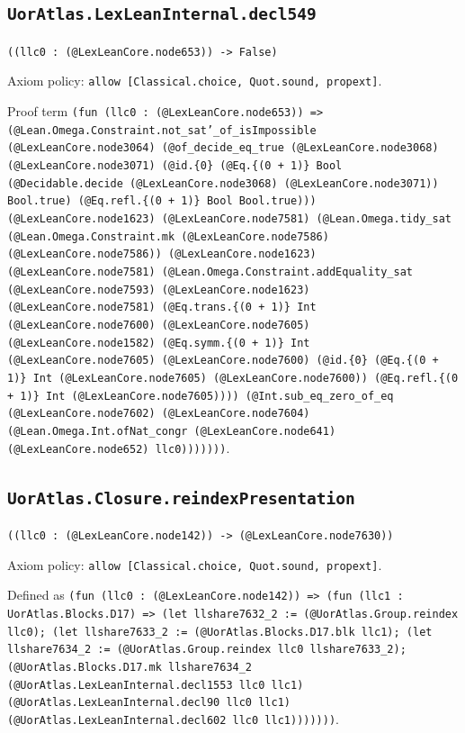 \documentclass[11pt]{article}
\begin{document}
\subsection*{\texttt{UorAtlas.LexLeanInternal.decl549}}
\noindent\texttt{((llc0 : (@LexLeanCore.node653)) -> False)}\par
\noindent Axiom policy: \texttt{allow [Classical.choice, Quot.sound, propext]}.\par
\noindent Proof term \texttt{(fun (llc0 : (@LexLeanCore.node653)) => (@Lean.Omega.Constraint.not\_sat'\_of\_isImpossible (@LexLeanCore.node3064) (@of\_decide\_eq\_true (@LexLeanCore.node3068) (@LexLeanCore.node3071) (@id.\{0\} (@Eq.\{(0 + 1)\} Bool (@Decidable.decide (@LexLeanCore.node3068) (@LexLeanCore.node3071)) Bool.true) (@Eq.refl.\{(0 + 1)\} Bool Bool.true))) (@LexLeanCore.node1623) (@LexLeanCore.node7581) (@Lean.Omega.tidy\_sat (@Lean.Omega.Constraint.mk (@LexLeanCore.node7586) (@LexLeanCore.node7586)) (@LexLeanCore.node1623) (@LexLeanCore.node7581) (@Lean.Omega.Constraint.addEquality\_sat (@LexLeanCore.node7593) (@LexLeanCore.node1623) (@LexLeanCore.node7581) (@Eq.trans.\{(0 + 1)\} Int (@LexLeanCore.node7600) (@LexLeanCore.node7605) (@LexLeanCore.node1582) (@Eq.symm.\{(0 + 1)\} Int (@LexLeanCore.node7605) (@LexLeanCore.node7600) (@id.\{0\} (@Eq.\{(0 + 1)\} Int (@LexLeanCore.node7605) (@LexLeanCore.node7600)) (@Eq.refl.\{(0 + 1)\} Int (@LexLeanCore.node7605)))) (@Int.sub\_eq\_zero\_of\_eq (@LexLeanCore.node7602) (@LexLeanCore.node7604) (@Lean.Omega.Int.ofNat\_congr (@LexLeanCore.node641) (@LexLeanCore.node652) llc0)))))))}.\par
\subsection*{\texttt{UorAtlas.Closure.reindexPresentation}}
\noindent\texttt{((llc0 : (@LexLeanCore.node142)) -> (@LexLeanCore.node7630))}\par
\noindent Axiom policy: \texttt{allow [Classical.choice, Quot.sound, propext]}.\par
\noindent Defined as \texttt{(fun (llc0 : (@LexLeanCore.node142)) => (fun (llc1 : UorAtlas.Blocks.D17) => (let llshare7632\_2 := (@UorAtlas.Group.reindex llc0); (let llshare7633\_2 := (@UorAtlas.Blocks.D17.blk llc1); (let llshare7634\_2 := (@UorAtlas.Group.reindex llc0 llshare7633\_2); (@UorAtlas.Blocks.D17.mk llshare7634\_2 (@UorAtlas.LexLeanInternal.decl1553 llc0 llc1) (@UorAtlas.LexLeanInternal.decl90 llc0 llc1) (@UorAtlas.LexLeanInternal.decl602 llc0 llc1)))))))}.\par
\end{document}
